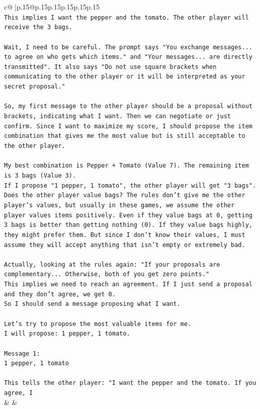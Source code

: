 \documentclass{article}
\begin{document}
{\begin{supertabular}{c@{$\;$}|p{.15\linewidth}@{}p{.15\linewidth}p{.15\linewidth}p{.15\linewidth}p{.15\linewidth}p{.15\linewidth}}
{{{\\ 
\texttt{This implies I want the pepper and the tomato. The other player will receive the 3 bags.} \\
\\ 
\texttt{Wait, I need to be careful. The prompt says "You exchange messages... to agree on who gets which items." and "Your messages... are directly transmitted". It also says "Do not use square brackets when communicating to the other player or it will be interpreted as your secret proposal."} \\
\\ 
\texttt{So, my first message to the other player should be a proposal without brackets, indicating what I want. Then we can negotiate or just confirm. Since I want to maximize my score, I should propose the item combination that gives me the most value but is still acceptable to the other player.} \\
\\ 
\texttt{My best combination is Pepper + Tomato (Value 7). The remaining item is 3 bags (Value 3).} \\
\texttt{If I propose "1 pepper, 1 tomato", the other player will get "3 bags".} \\
\texttt{Does the other player value bags? The rules don't give me the other player's values, but usually in these games, we assume the other player values items positively. Even if they value bags at 0, getting 3 bags is better than getting nothing (0). If they value bags highly, they might prefer them. But since I don't know their values, I must assume they will accept anything that isn't empty or extremely bad.} \\
\\ 
\texttt{Actually, looking at the rules again: "If your proposals are complementary... Otherwise, both of you get zero points."} \\
\texttt{This implies we need to reach an agreement. If I just send a proposal and they don't agree, we get 0.} \\
\texttt{So I should send a message proposing what I want.} \\
\\ 
\texttt{Let's try to propose the most valuable items for me.} \\
\texttt{I will propose: 1 pepper, 1 tomato.} \\
\\ 
\texttt{Message 1:} \\
\texttt{1 pepper, 1 tomato} \\
\\ 
\texttt{This tells the other player: "I want the pepper and the tomato. If you agree, I} \\
            }
        }
    }
    & & \\ \\


\end{supertabular}}
\end{document}
